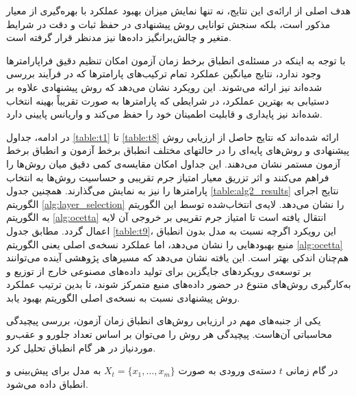 هدف اصلی از ارائه‌ی این نتایج، نه تنها نمایش میزان بهبود عملکرد با بهره‌گیری از معیار مذکور است، بلکه سنجش توانایی روش پیشنهادی در حفظ ثبات و دقت در شرایط متغیر و چالش‌برانگیز داده‌ها نیز مدنظر قرار گرفته است.

با توجه به اینکه در مسئله‌ی انطباق برخط زمان آزمون امکان تنظیم دقیق فراپارامترها وجود ندارد، نتایج میانگین عملکرد تمام ترکیب‌های پارامترها که در فرآیند  بررسی شده‌اند نیز ارائه می‌شوند. این رویکرد نشان می‌دهد که روش پیشنهادی علاوه بر دستیابی به بهترین عملکرد، در شرایطی که پارامترها به صورت تقریباً بهینه انتخاب شده‌اند نیز پایداری و قابلیت اطمینان خود را حفظ می‌کند و واریانس پایینی دارد.

در ادامه، جداول \ref{table:t1} تا \ref{table:t8} ارائه شده‌اند که نتایج حاصل از ارزیابی روش پیشنهادی و روش‌های پایه‌ای را در حالتهای مختلف انطباق برخط آزمون و انطباق برخط آزمون مستمر نشان می‌دهند. این جداول امکان مقایسه‌ی کمی دقیق میان روش‌ها را فراهم می‌کنند و اثر تزریق معیار امتیاز جرم تقریبی و حساسیت روش‌ها به انتخاب پارامترها را نیز به نمایش می‌گذارند.
همچنین جدول \ref{table:alg2_results} نتایج اجرای الگوریتم \ref{alg:layer_selection} را نشان می‌دهد. لایه‌ی انتخاب‌شده توسط این الگوریتم به الگوریتم \ref{alg:ocetta} انتقال یافته است تا امتیاز جرم تقریبی بر خروجی آن لایه اعمال گردد. مطابق جدول \ref{table:t9}، این رویکرد اگرچه نسبت به مدل بدون انطباق منبع بهبودهایی را نشان می‌دهد، اما عملکرد نسخه‌ی اصلی یعنی الگوریتم \ref{alg:ocetta} هم‌چنان اندکی بهتر است. این یافته نشان می‌دهد که مسیرهای پژوهشی آینده می‌توانند بر توسعه‌ی رویکردهای جایگزین برای تولید داده‌های مصنوعی خارج از توزیع و به‌کارگیری روش‌های متنوع در حضور داده‌های منبع متمرکز شوند، تا بدین ترتیب عملکرد روش پیشنهادی نسبت به نسخه‌ی اصلی الگوریتم بهبود یابد.\\












یکی از جنبه‌های مهم در ارزیابی روش‌های انطباق زمان آزمون، بررسی پیچیدگی محاسباتی آن‌هاست. پیچیدگی هر روش را می‌توان بر اساس تعداد {جلورو} و {عقب‌رو} موردنیاز در هر گام انطباق تحلیل کرد.  

در گام زمانی $t$ دسته‌ی ورودی به صورت $X_t = \{x_1, \dots, x_m\}$ به مدل برای پیش‌بینی و انطباق داده می‌شود.  

